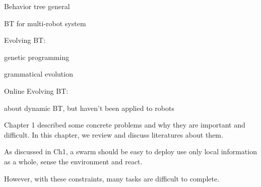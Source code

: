 Behavior tree general
\cite{colledanchise2018behavior}
\cite{iovino2022survey}

BT for multi-robot system
\cite{colledanchise2016advantages}
\cite{jeong2022behavior}

Evolving BT:

genetic programming
\cite{jones2018evolving}
\cite{kuckling2022automode}

grammatical evolution
\cite{neupane2019learning}
\cite{kuckling2022automode}

Online Evolving BT:

\cite{jones2019onboard}
\cite{venkata2023kt}


\cite{florez2008dynamic} about dynamic BT, but haven't been applied to robots















Chapter 1 described some concrete problems and why they are important and difficult.
In this chapter, we review and discuss literatures about them.

As discussed in Ch1, a swarm should be
    easy to deploy
    use only local information
    as a whole, sense the environment and react.

However, with these constraints, many tasks are difficult to complete.

